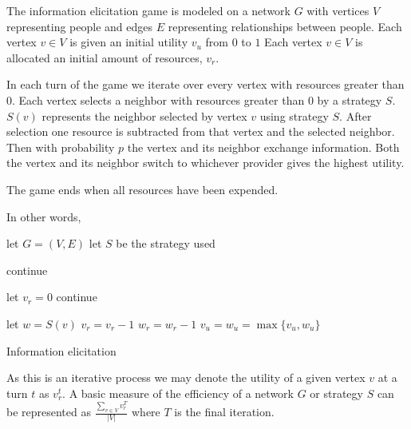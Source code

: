 \documentclass{article}
\begin{document}
The information elicitation game is modeled on a network $G$ with vertices $V$ representing people and edges $E$ representing relationships between people.
Each vertex $v \in V$ is given an initial utility $v_u$ from $0$ to $1$
Each vertex $v \in V$ is allocated an initial amount of resources, $v_r$.

In each turn of the game we iterate over every vertex with resources greater than $0$.
Each vertex selects a neighbor with resources greater than $0$ by a strategy $S$.
$S(v)$ represents the neighbor selected by vertex $v$ using strategy $S$.
After selection one resource is subtracted from that vertex and the selected neighbor.
Then with probability $p$ the vertex and its neighbor exchange information.
Both the vertex and its neighbor switch to whichever provider gives the highest utility.

The game ends when all resources have been expended.

In other words,

\begin{algorithm}[H]
\SetAlgoLined
 let $G = (V, E)$\;
 let $S$ be the strategy used\;
  {
 	 {
 		 {
 			continue\;
 		}
 		
 		 {
 			let $v_r = 0$\;
 			continue\;
 		}
 		
 		let $w = S(v)$\;
 		$v_r = v_r - 1$\;
 		$w_r = w_r - 1$\;
 		$v_u = w_u = \max\{v_u, w_u\}$\;
 	}
 }
 \caption{Information elicitation}
\end{algorithm}

As this is an iterative process we may denote the utility of a given vertex $v$ at a turn $t$ as $v_r^t$.
A basic measure of the efficiency of a network $G$ or strategy $S$ can be represented as $\frac{\sum_{v \in V} v_r^T}{|V|}$ where $T$ is the final iteration.
\end{document}
